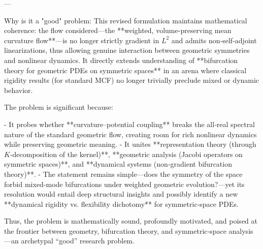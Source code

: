 ---

Why is it a "good" problem:  
This revised formulation maintains mathematical coherence: the flow considered—the **weighted, volume-preserving mean curvature flow**—is no longer strictly gradient in \(L^2\) and admits non‑self‑adjoint linearizations, thus allowing genuine interaction between geometric symmetries and nonlinear dynamics.  
It directly extends understanding of **bifurcation theory for geometric PDEs on symmetric spaces** in an arena where classical rigidity results (for standard MCF) no longer trivially preclude mixed or dynamic behavior.  

The problem is significant because:

- It probes whether **curvature–potential coupling** breaks the all‑real spectral nature of the standard geometric flow, creating room for rich nonlinear dynamics while preserving geometric meaning.  
- It unites **representation theory (through \(K\)-decomposition of the kernel)**, **geometric analysis (Jacobi operators on symmetric spaces)**, and **dynamical systems (non‑gradient bifurcation theory)**.  
- The statement remains simple—does the symmetry of the space forbid mixed‑mode bifurcations under weighted geometric evolution?—yet its resolution would entail deep structural insights and possibly identify a new **dynamical rigidity vs. flexibility dichotomy** for symmetric‑space PDEs.

Thus, the problem is mathematically sound, profoundly motivated, and poised at the frontier between geometry, bifurcation theory, and symmetric‑space analysis—an archetypal “good” research problem.